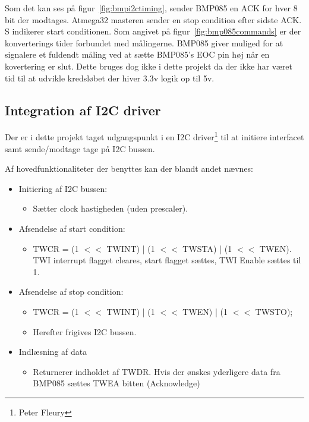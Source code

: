 Som det kan ses på figur~\ref{fig:bmpi2ctiming}, sender BMP085 en ACK for hver 8 bit der modtages. Atmega32 masteren sender en stop condition efter sidste ACK. S indikerer start conditionen.
Som angivet på figur~\ref{fig:bmp085commands} er der konverterings tider forbundet med målingerne. BMP085 giver muliged for at signalere et fuldendt måling ved at sætte BMP085’s EOC pin høj når en kovertering er slut. Dette bruges dog ikke i dette projekt da der ikke har været tid til at udvikle kredsløbet der hiver 3.3v logik op til 5v.

\subsection{Integration af I2C driver}

Der er i dette projekt taget udgangspunkt i en I2C driver\footnote{Peter Fleury} til at initiere interfacet samt sende/modtage tage på I2C bussen.

Af hovedfunktionaliteter der benyttes kan der blandt andet nævnes:

\begin{itemize}
	\item Initiering af I2C bussen:
	\begin{itemize}
		\item Sætter clock hastigheden (uden prescaler).
	\end{itemize}
	
	\item Afsendelse af start condition:
	\begin{itemize}
		\item TWCR = (1 $<<$ TWINT) | (1 $<<$ TWSTA) | (1 $<<$ TWEN). TWI interrupt flagget cleares, start flagget sættes, TWI Enable sættes til 1.
	\end{itemize}
	
	\item Afsendelse af stop condition:
	\begin{itemize}
		\item TWCR = (1 $<<$ TWINT) | (1 $<<$ TWEN) | (1 $<<$ TWSTO);
		\item Herefter frigives I2C bussen.
	\end{itemize}
	
	\item Indlæsning af data
	\begin{itemize}
		\item Returnerer indholdet af TWDR. Hvis der ønskes yderligere data fra BMP085 sættes TWEA bitten (Acknowledge)
	\end{itemize}
	
\end{itemize}

